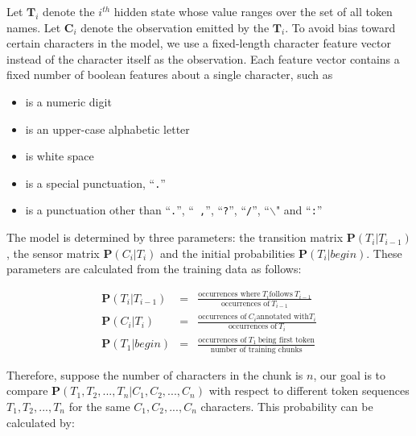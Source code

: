  
Let $\mathbf{T}_i$ denote the $i^{th}$ hidden state whose value ranges over
the set of all token names.
Let $\mathbf{C}_i$ denote the observation emitted by the $\mathbf{T}_i$.
To avoid bias toward certain characters in the model, we use
a fixed-length character feature vector instead of the character itself
as the observation. Each feature vector contains a
fixed number of boolean features about a single character, such as
\begin{itemize}
\item is a numeric digit
\item is an upper-case alphabetic letter
\item is white space
\item is a special punctuation, ``{\tt .}''
\item is a punctuation other than ``{\tt .}'', ``{\tt
,}'', ``{\tt ?}'', ``{\tt /}'', ``{\tt $\backslash$}" and ``{\tt :}''
\end{itemize}

The model is determined by three parameters: 
the transition matrix $\mathbf{P}(T_i|T_{i-1})$,
the sensor matrix $\mathbf{P}(C_i|T_i)$ and the initial
probabilities $\mathbf{P}(T_i|begin)$. These parameters are calculated
from the training data as follows:

\begin{eqnarray}
\mathbf{P}(T_i|T_{i-1}) & = & \frac{\textrm{occurrences where}~ T_i\textrm{
follows}~ T_{i-1}}{\textrm{occurrences of}~ T_{i-1}} \label{eqn:1}\\
\mathbf{P}(C_i|T_i) & = & \frac{\textrm{occurrences of}~ C_i \textrm{
annotated with} T_i}{\textrm{occurrences of}~ T_i} \\
\mathbf{P}(T_1|begin) & = & \frac{\textrm{occurrences of}~ T_1~ \textrm{being first token}}
{\textrm{number of training chunks}} \label{eqn:2}
\end{eqnarray}

Therefore, suppose the number of characters in the chunk is $n$, our
goal is to compare $\mathbf{P}(T_1, T_2, ..., T_n|C_1, C_2, ..., C_n)$
with respect to different token sequences $T_1, T_2, ..., T_n$ for the
same $C_1, C_2, ..., C_n$ characters. This probability can be
calculated by:

